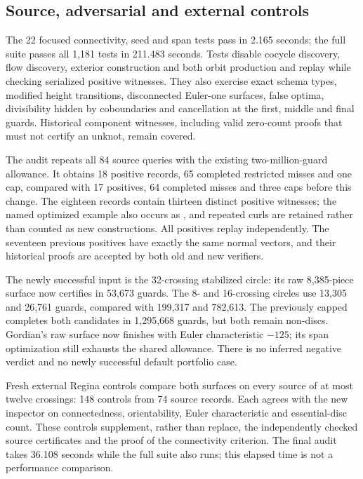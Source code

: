 \subsection{Source, adversarial and external controls}

The 22 focused connectivity, seed and span tests pass in 2.165 seconds;
the full suite passes all 1,181 tests in 211.483 seconds. Tests disable
cocycle discovery, flow discovery, exterior construction and both orbit
production and replay while checking serialized positive witnesses. They
also exercise exact schema types, modified height transitions, disconnected
Euler-one surfaces, false optima, divisibility hidden by coboundaries and
cancellation at the first, middle and final guards. Historical component
witnesses, including valid zero-count proofs that must not certify an
unknot, remain covered.

The audit repeats all 84 source queries with the existing two-million-guard
allowance. It obtains 18 positive records, 65 completed restricted misses
and one cap, compared with 17 positives, 64 completed misses and three
caps before this change. The eighteen records contain thirteen distinct
positive witnesses; the named optimized example also occurs as
, and repeated curls are retained rather than counted
as new constructions. All positives replay independently. The seventeen
previous positives have exactly the same normal vectors, and their
historical proofs are accepted by both old and new verifiers.

The newly successful input is the 32-crossing stabilized circle: its raw
8,385-piece surface now certifies in 53,673 guards. The 8- and 16-crossing
circles use 13,305 and 26,761 guards, compared with 199,317 and 782,613.
The previously capped  completes both candidates in
1,295,668 guards, but both remain non-discs. Gordian's raw surface now
finishes with Euler characteristic $-125$; its span optimization still
exhausts the shared allowance. There is no inferred negative verdict and
no newly successful default portfolio case.

Fresh external Regina controls compare both surfaces on every source of at
most twelve crossings: 148 controls from 74 source records. Each agrees
with the new inspector on connectedness, orientability, Euler characteristic
and essential-disc count. These controls supplement, rather than replace,
the independently checked source certificates and the proof of the
connectivity criterion. The final audit takes 36.108 seconds while the
full suite also runs; this elapsed time is not a performance comparison.

